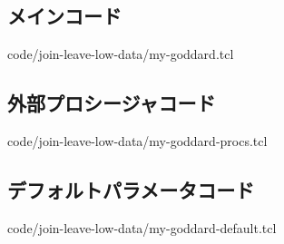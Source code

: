 \subsection{メインコード}
\label{txt:join-leave-low-data-my-goddard}

{code/join-leave-low-data/my-goddard.tcl}

\subsection{外部プロシージャコード}
\label{txt:join-leave-low-data-my-goddard-procs}

{code/join-leave-low-data/my-goddard-procs.tcl}

\subsection{デフォルトパラメータコード}
\label{txt:join-leave-low-data-my-goddard-default}

{code/join-leave-low-data/my-goddard-default.tcl}



